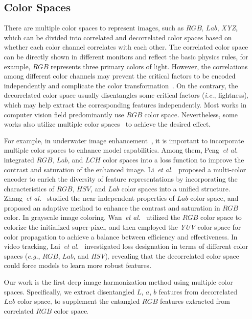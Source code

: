 \documentclass[sigconf]{acmart}
\begin{document}
\subsection{Color Spaces}
There are multiple color spaces to represent images, such as $RGB$, $Lab$, \textit{XYZ}, which can be divided into correlated and decorrelated color spaces based on whether each color channel correlates with each other. 
The correlated color space can be directly shown in different monitors and reflect the basic physics rules, for example, $RGB$ represents three primary colors of light.
However, the correlations among different color channels may prevent the critical factors to be encoded independently and complicate the color transformation~\cite{reinhard2001color}.
On the contrary, the decorrelated color space usually disentangles some critical factors (\emph{i.e.}, lightness), which may help extract the corresponding features independently.
Most works in computer vision field predominantly use $RGB$ color space. 
Nevertheless, some works also utilize multiple color spaces~\cite{peng2023u, li2021underwater} to achieve the desired effect. 

For example, in underwater image enhancement~\cite{peng2023u, li2021underwater, ma2022wavelet, zhang2022underwater}, it is important to incorporate multiple color spaces to enhance model capabilities.
Among them, Peng~\emph{et al.}\cite{peng2023u} integrated $RGB$, $Lab$, and $LCH$ color spaces into a loss function to improve the contrast and saturation of the enhanced image. 
Li~\emph{et al.}~\cite{li2021underwater} proposed a multi-color encoder to enrich the diversity of feature representations by incorporating the characteristics of $RGB$, $HSV$, and $Lab$ color spaces into a unified structure. 
Zhang~\emph{et al.}~\cite{zhang2022underwater} studied the near-independent properties of $Lab$ color space, and proposed an adaptive method to enhance the contrast and saturation in $RGB$ color.
In grayscale image coloring, Wan~\emph{et al.}~\cite{wan2020automated} utilized the $RGB$ color space to colorize the initialized super-pixel, and then employed the \textit{YUV} color space for color propagation to achieve a balance between efficiency and effectiveness. 
In video tracking, Lai~\emph{et al.}~\cite{lai2020mast} investigated loss designation in terms of different color spaces (\emph{e.g.}, $RGB$, $Lab$, and \textit{HSV}), revealing that the decorrelated color space could force models to learn more robust features.

Our work is the first deep image harmonization method using multiple color spaces. Specifically, we extract disentangled $L$, $a$, $b$ features from decorrelated $Lab$ color space, to supplement the entangled $RGB$ features extracted from correlated $RGB$ color space. 
\end{document}
